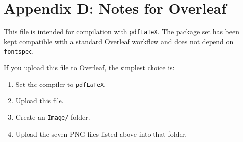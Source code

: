 \documentclass[12pt,a4paper]{article}
\begin{document}
\section{Appendix D: Notes for Overleaf}
This file is intended for compilation with \texttt{pdfLaTeX}. The package set has been kept compatible with a standard Overleaf workflow and does not depend on \texttt{fontspec}.

If you upload this file to Overleaf, the simplest choice is:
\begin{enumerate}[label=\arabic*.]
  \item Set the compiler to \texttt{pdfLaTeX}.
  \item Upload this file.
  \item Create an \texttt{Image/} folder.
  \item Upload the seven PNG files listed above into that folder.
\end{enumerate}
\end{document}
